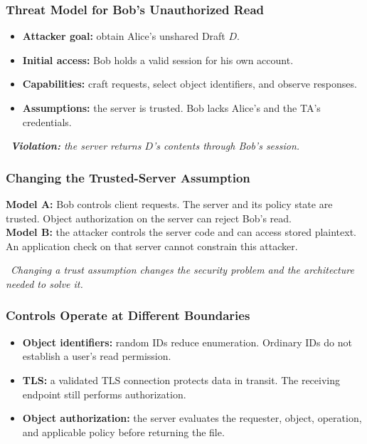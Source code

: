 \documentclass[hidelinks]{article}
\newcommand{\callout}[1]{\par\smallskip\noindent{\color{capri}$\blacktriangleright$}\ \textit{#1}\par\smallskip}
\begin{document}
\subsubsection{Threat Model for Bob's Unauthorized Read}

\begin{itemize}
    \item \textbf{Attacker goal:} obtain Alice's unshared Draft $D$.
    \item \textbf{Initial access:} Bob holds a valid session for his own account.
    \item \textbf{Capabilities:} craft requests, select object identifiers, and observe responses.
    \item \textbf{Assumptions:} the server is trusted. Bob lacks Alice's and the TA's credentials.
\end{itemize}

\callout{\textbf{Violation:} the server returns $D$'s contents through Bob's session.}

\subsubsection{Changing the Trusted-Server Assumption}

\textbf{Model A:} Bob controls client requests. The server and its policy state are trusted. Object authorization on the server can reject Bob's read.\\[2pt]
\textbf{Model B:} the attacker controls the server code and can access stored plaintext. An application check on that server cannot constrain this attacker.

\callout{Changing a trust assumption changes the security problem and the architecture needed to solve it.}

\subsubsection{Controls Operate at Different Boundaries}

\begin{itemize}
    \item \textbf{Object identifiers:} random IDs reduce enumeration. Ordinary IDs do not establish a user's read permission.
    \item \textbf{TLS:} a validated TLS connection protects data in transit. The receiving endpoint still performs authorization.
    \item \textbf{Object authorization:} the server evaluates the requester, object, operation, and applicable policy before returning the file.
\end{itemize}
\end{document}
